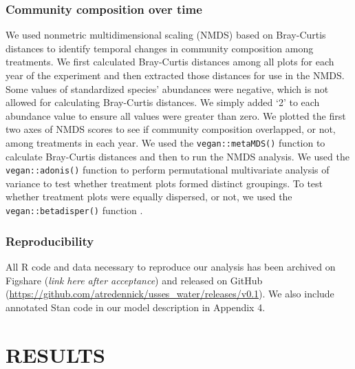 \documentclass[fleqn,10pt,lineno]{wlpeerj} %
\begin{document}
\subsubsection{Community composition over
time}\label{community-composition-over-time}

We used nonmetric multidimensional scaling (NMDS) based on Bray-Curtis
distances to identify temporal changes in community composition among
treatments. We first calculated Bray-Curtis distances among all plots
for each year of the experiment and then extracted those distances for
use in the NMDS. Some values of standardized species' abundances were
negative, which is not allowed for calculating Bray-Curtis distances. We
simply added `2' to each abundance value to ensure all values were
greater than zero. We plotted the first two axes of NMDS scores to see
if community composition overlapped, or not, among treatments in each
year. We used the \texttt{vegan::metaMDS()} function \citep{Oksanen2016}
to calculate Bray-Curtis distances and then to run the NMDS analysis. We
used the \texttt{vegan::adonis()} function \citep{Oksanen2016} to
perform permutational multivariate analysis of variance to test whether
treatment plots formed distinct groupings. To test whether treatment
plots were equally dispersed, or not, we used the
\texttt{vegan::betadisper()} function \citep{Oksanen2016}.


\subsubsection{Reproducibility}\label{reproducibility}

All R code and data necessary to reproduce our analysis has been
archived on Figshare (\emph{link here after acceptance}) and released on
GitHub (\url{https://github.com/atredennick/usses_water/releases/v0.1}).
We also include annotated Stan code in our model description in Appendix
4.

\section{RESULTS}\label{results}
\end{document}
